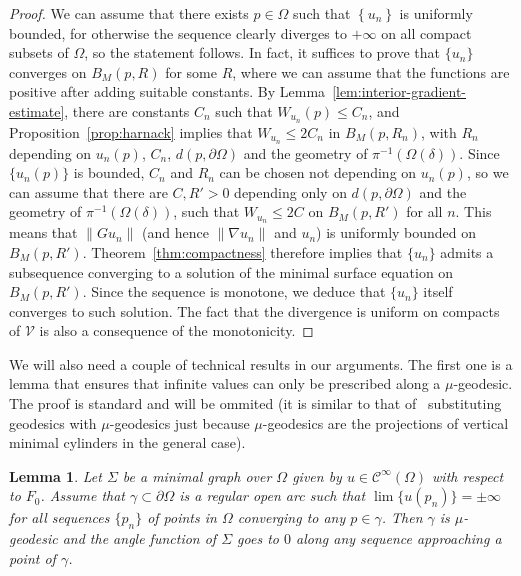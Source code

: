 \documentclass[a4paper,10pt,reqno]{amsart}
\newtheorem{lemma}[theorem]{Lemma}
\theoremstyle{definition}
\theoremstyle{remark}
\numberwithin{equation}{section}
\begin{document}
\begin{proof} 
We can assume that there exists $p\in\Omega$ such that $\left\{u_n\right\}$ is uniformly bounded, for otherwise the sequence clearly diverges to $+\infty$ on all compact subsets of $\Omega$, so the statement follows. In fact, it suffices to prove that $\{u_n\}$ converges on $B_M(p,R)$ for some $R$, where we can assume that the functions are positive after adding suitable constants. By Lemma~\ref{lem:interior-gradient-estimate}, there are constants $C_n$ such that $W_{u_n}(p)\leq C_n$, and Proposition~\ref{prop:harnack} implies that $W_{u_n}\leq 2C_n$ in $B_M(p,R_n)$, with $R_n$ depending on $u_n(p)$, $C_n$, $d(p,\partial \Omega)$ and the geometry of $\pi^{-1}(\Omega(\delta))$. Since $\{u_n(p)\}$ is bounded, $C_n$ and $R_n$ can be chosen not depending on $u_n(p)$, so we can assume that there are $C,R'>0$ depending only on $d(p,\partial \Omega)$ and the geometry of $\pi^{-1}(\Omega(\delta))$, such that $W_{u_n}\leq 2C$ on $B_M(p,R')$ for all $n$. This means that $\|Gu_n\|$ (and hence $\|\nabla u_n\|$ and $u_n$) is uniformly bounded on $B_M(p,R')$. Theorem~\ref{thm:compactness} therefore implies that $\{u_n\}$ admits a subsequence converging to a solution of the minimal surface equation on $B_M(p,R')$. Since the sequence is monotone, we deduce that $\{u_n\}$ itself converges to such solution. The fact that the divergence is uniform on compacts of $\mathcal V$ is also a consequence of the monotonicity.
\end{proof}
	
We will also need a couple of technical results in our arguments. The first one is a lemma that ensures that infinite values can only be prescribed along a $\mu$-geodesic. The proof is standard and will be ommited (it is similar to that of~\cite[Thm.~3.3]{RST} substituting geodesics with $\mu$-geodesics just because $\mu$-geodesics are the projections of vertical minimal cylinders in the general case).

\begin{lemma}\label{lemma:boundary-structure}
Let $\Sigma$ be a minimal graph over $\Omega$ given by $u\in\mathcal C^\infty(\Omega)$ with respect to $F_0$. Assume that $\gamma\subset\partial\Omega$ is a regular open arc such that $\lim\{u(p_n)\}=\pm\infty$ for all sequences $\{p_n\}$ of points in $\Omega$ converging to any $p\in\gamma$. Then $\gamma$ is $\mu$-geodesic and the angle function of $\Sigma$ goes to $0$ along any sequence approaching a point of $\gamma$.
\end{lemma}
\end{document}
